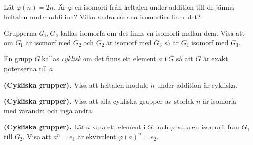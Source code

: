 \documentclass[11pt,fleqn]{book} %
\begin{document}
%   

\begin{problem}
  Låt \(\varphi (n) = 2n\). Är \(\varphi\) en isomorfi från heltalen under addition till de jämna heltalen under addition? Vilka andra sådana isomorfier finns det? 
\end{problem}

\begin{problem}
  Grupperna \(G_1, G_2\) kallas isomorfa om det finns en isomorfi mellan dem. Visa att om \(G_1\) är isomorf med \(G_2\) och \(G_2\) är isomorf med \(G_3\) så är \(G_1\) isomorf med \(G_3\).
\end{problem}


\begin{definition}
  En grupp \(G\) kallas \textit{cyklisk} om det finns ett element \(a\) i \(G\) så att \(G\) är exakt potenserna till \(a\). 
\end{definition}

\begin{problem}\textbf{(Cykliska grupper).} Visa att heltalen modulo \(n\) under addition är cykliska.
\end{problem}

\begin{problem}\textbf{(Cykliska grupper).} Visa att alla cykliska grupper av storlek \(n\) är isomorfa med varandra och inga andra.
\end{problem}

\begin{problem} \textbf{(Cykliska grupper).} Låt \(a\) vara ett element i \(G_1\) och \(\varphi \) vara en isomorfi från \(G_1\) till \(G_2\). Visa att \(a^n = e_1 \) är ekvivalent \(\varphi(a)^n = e_2\).
\end{problem}
\end{document}
